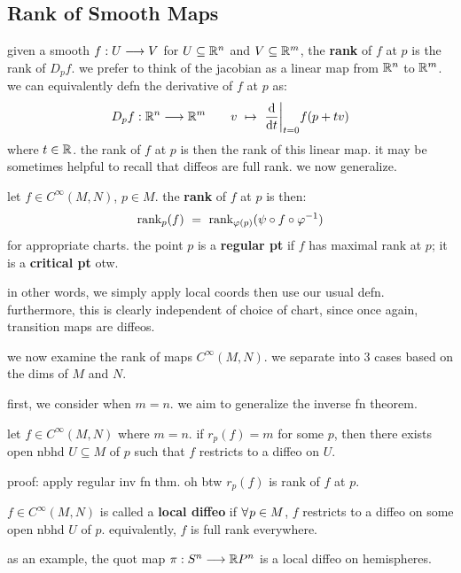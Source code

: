 \subsection{Rank of Smooth Maps}

given a smooth $f:U\longrightarrow V$ for $U\subseteq\mathbb{R}^{n}$ and $V\subseteq\mathbb{R}^{m}$,
the \textbf{rank} of $f$ at $p$ is the rank of $D_{p}f$.
we prefer to think of the jacobian as a linear map from $\mathbb{R}^{n}$ to $\mathbb{R}^{m}$.
we can equivalently defn the derivative of $f$ at $p$ as:
\begin{equation*}
	D_{p}f:\bR^{n}\gto\bR^{m} \qquad v \ \mto \ \frac{\d}{\d t}\bigg\rvert_{t=0}f(p+tv)
\end{equation*}
where $t\in\mathbb{R}$. the rank of $f$ at $p$ is then the rank of this linear map.
it may be sometimes helpful to recall that diffeos are full rank.
we now generalize.

\begin{defn}
	let $f\in C^{\infty}(M,N)$, $p\in M$. the \textbf{rank} of $f$ at $p$ is then:
	\begin{equation*}
		\trm{rank}_{p}(f) \ = \ \trm{rank}_{\vphi(p)}(\psi\circ f\circ\vphi^{-1})
	\end{equation*}
	for appropriate charts. the point $p$ is a \textbf{regular pt} if $f$ has
	maximal rank at $p$; it is a \textbf{critical pt} otw.
\end{defn}
in other words, we simply apply local coords then use our usual defn.
furthermore, this is clearly independent of choice of chart, since once again,
transition maps are diffeos.

we now examine the rank of maps $C^{\infty}(M,N)$.
we separate into 3 cases based on the dims of $M$ and $N$.

first, we consider when $m=n$. we aim to generalize the inverse fn theorem.
\begin{thm}[title=Inverse Function Theorem]
	let $f\in C^{\infty}(M,N)$ where $m=n$. if $r_{p}(f)=m$ for some $p$, then
	there exists open nbhd $U\subseteq M$ of $p$ such that $f$ restricts to a diffeo on $U$.
\end{thm}
proof: apply regular inv fn thm. oh btw $r_{p}(f)$ is rank of $f$ at $p$.

\begin{defn}
	$f\in C^{\infty}(M,N)$ is called a \textbf{local diffeo} if $\fa p\in M$,
	$f$ restricts to a diffeo on some open nbhd $U$ of $p$.
	equivalently, $f$ is full rank everywhere.
\end{defn}
as an example, the quot map $\pi:S^{n}\longrightarrow\mathbb{R} P^{n}$ is a local diffeo on hemispheres.

